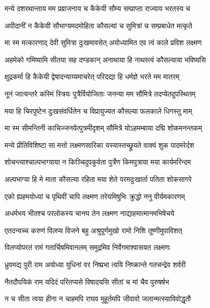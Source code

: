 \twolineshloka
{मन्ये दशरथान्ताय मम प्रव्राजनाय च}
{कैकेयी सौम्य सम्प्राप्ता राज्याय भरतस्य च} %

\twolineshloka
{अपीदानीं न कैकेयी सौभाग्यमदमोहिता}
{कौसल्यां च सुमित्रां च सम्प्रबाधेत मत्कृते} %

\twolineshloka
{मा स्म मत्कारणाद् देवी सुमित्रा दुःखमावसेत्}
{अयोध्यामित एव त्वं काले प्रविश लक्ष्मण} %

\twolineshloka
{अहमेको गमिष्यामि सीतया सह दण्डकान्}
{अनाथाया हि नाथस्त्वं कौसल्याया भविष्यसि} %

\twolineshloka
{क्षुद्रकर्मा हि कैकेयी द्वेषादन्याय्यमाचरेत्}
{परिदद्या हि धर्मज्ञे भरते मम मातरम्} %

\twolineshloka
{नूनं जात्यन्तरे कस्मिं स्त्रियः पुत्रैर्वियोजिताः}
{जनन्या मम सौमित्रे तदप्येतदुपस्थितम्} %

\twolineshloka
{मया हि चिरपुष्टेन दुःखसंवर्धितेन च}
{विप्रायुज्यत कौसल्या फलकाले धिगस्तु माम्} %

\twolineshloka
{मा स्म सीमन्तिनी काचिज्जनयेत्पुत्रमीदृशम्}
{सौमित्रे योऽहमम्बाया दद्मि शोकमनन्तकम्} %

\twolineshloka
{मन्ये प्रीतिविशिष्टा सा मत्तो लक्ष्मणसारिका}
{यस्यास्तच्छ्रूयते वाक्यं शुक पादमरेर्दश} %

\twolineshloka
{शोचन्त्याश्चाल्पभाग्याया न किञ्चिदुपकुर्वता}
{पुर्त्रेण किमपुत्राया मया कार्यमरिन्दम} %

\twolineshloka
{अल्पभाग्या हि मे माता कौसल्या रहिता मया}
{शेते परमदुःखार्ता पतिता शोकसागरे} %

\twolineshloka
{एको ह्यहमयोध्यां च पृथिवीं चापि लक्ष्मण}
{तरेयमिषुभिः क्रुद्धो ननु वीर्यमकारणम्} %

\twolineshloka
{अधर्मभय भीतश्च परलोकस्य चानघ}
{तेन लक्ष्मण नाद्याहमात्मानमभिषेचये} %

\twolineshloka
{एतदन्यच्च करुणं विलप्य विजने बहु}
{अश्रुपूर्णमुखो रामो निशि तूष्णीमुपाविशत्} %

\twolineshloka
{विलप्योपरतं रामं गतार्चिषमिवानलम्}
{समुद्रमिव निर्वेगमाश्वासयत लक्ष्मणः} %

\twolineshloka
{ध्रुवमद्य पुरी राम अयोध्या युधिनां वर}
{निष्प्रभा त्वयि निष्क्रान्ते गतचन्द्रेव शर्वरी} %

\twolineshloka
{नैतदौपयिकं राम यदिदं परितप्यसे}
{विषादयसि सीतां च मां चैव पुरुषर्षभ} %

\twolineshloka
{न च सीता त्वया हीना न चाहमपि राघव}
{मुहूर्तमपि जीवावो जलान्मत्स्याविवोद्धृतौ} %

